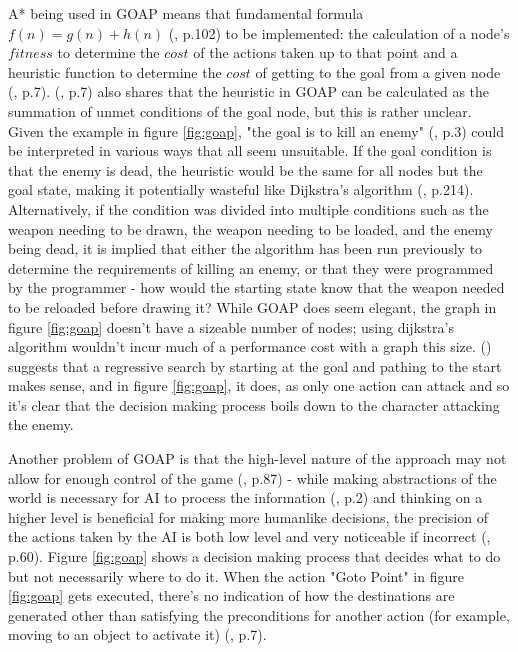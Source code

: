 \documentclass[11pt, a4paper]{article}
\begin{document}
A* being used in GOAP means that fundamental formula $f(n) = g(n) + h(n)$ (\cite{hart1968formal}, p.102) to be implemented: the calculation of a node's $fitness$ to determine the $cost$ of the actions taken up to that point and a heuristic function to determine the $cost$ of getting to the goal from a given node (\cite{orkin2003applying}, p.7). \citeauthor{orkin2003applying} (\citeyear{orkin2003applying}, p.7) also shares that the heuristic in GOAP can be calculated as the summation of unmet conditions of the goal node, but this is rather unclear. Given the example in figure \ref{fig:goap}, "the goal is to kill an enemy" (\cite{orkin2003applying}, p.3) could be interpreted in various ways that all seem unsuitable. If the goal condition is that the enemy is dead, the heuristic would be the same for all nodes but the goal state, making it potentially wasteful like Dijkstra's algorithm (\cite{millington2019ai}, p.214). Alternatively, if the condition was divided into multiple conditions such as the weapon needing to be drawn, the weapon needing to be loaded, and the enemy being dead, it is implied that either the algorithm has been run previously to determine the requirements of killing an enemy, or that they were programmed by the programmer - how would the starting state know that the weapon needed to be reloaded before drawing it? While GOAP does seem elegant, the graph in figure \ref{fig:goap} doesn't have a sizeable number of nodes; using dijkstra's algorithm wouldn't incur much of a performance cost with a graph this size. \citeauthor{orkin2003applying} (\citeyear{orkin2003applying}) suggests that a regressive search by starting at the goal and pathing to the start makes sense, and in figure \ref{fig:goap}, it does, as only one action can attack and so it's clear that the decision making process boils down to the character attacking the enemy.

Another problem of GOAP is that the high-level nature of the approach may not allow for enough control of the game (\cite{stanciu2012implementing}, p.87) - while making abstractions of the world is necessary for AI to process the information (\cite{buro2004call}, p.2) and thinking on a higher level is beneficial for making more humanlike decisions, the precision of the actions taken by the AI is both low level and very noticeable if incorrect (\cite{graham2003pathfinding}, p.60). Figure \ref{fig:goap} shows a decision making process that decides what to do but not necessarily where to do it. When the action "Goto Point" in figure \ref{fig:goap} gets executed, there's no indication of how the destinations are generated other than satisfying the preconditions for another action (for example, moving to an object to activate it) (\cite{orkin2003applying}, p.7). 
\end{document}
